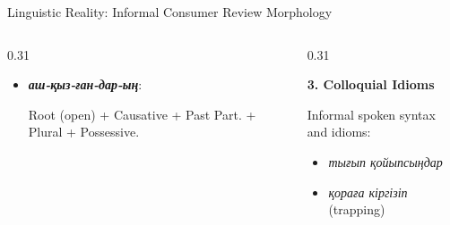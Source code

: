\documentclass[aspectratio=169, 10pt]{beamer}
\newcommand{\subhead}[1]{{\normalsize\textbf{\color{DarkNavy}#1}\par\vspace{3pt}}}
\begin{document}
\begin{frame}{Linguistic Reality: Informal Consumer Review Morphology}
\begin{columns}[T]
\begin{column}{0.31\textwidth}
\begin{itemize}
                \item \textbf{\textit{аш-қыз-ған-дар-ың}}:\par\vspace{1pt}
                {\scriptsize Root (open) + Causative + Past Part. + Plural + Possessive.}
            \end{itemize}
        \end{column}
        \begin{column}{0.31\textwidth}
            \subhead{3. Colloquial Idioms}
            {\footnotesize Informal spoken syntax and idioms:\par\vspace{2pt}}
            \begin{itemize}\setlength{\itemsep}{1pt}\footnotesize
                \item \textit{тығып қойыпсыңдар}
                \item \textit{қораға кіргізіп} (trapping)
            \end{itemize}
        \end{column}
    \end{columns}
\end{frame}
\end{document}
